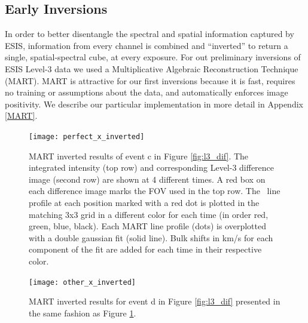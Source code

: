     
    
    
    \subsection{Early Inversions} \label{sec:inversions}
    	In order to better disentangle the spectral and spatial information captured by ESIS, information from every channel is combined and ``inverted'' to return a single, spatial-spectral cube, at every exposure.
    	For out preliminary inversions of ESIS Level-3 data we used a Multiplicative Algebraic Reconstruction Technique (MART).
    	MART is attractive for our first inversions because it is fast, requires no training or assumptions about the data, and automatically enforces image  positivity.
    	We describe our particular implementation in more detail in Appendix \ref{MART}.
    	
    	\begin{figure}[htb!]
    		\texttt{[image: perfect\_x\_inverted]}
    		\centering
    		\caption{MART inverted results of event c in Figure \ref{fig:l3_dif}. The integrated intensity (top row) and corresponding Level-3 difference image (second row) are shown at 4 different times. A red box on each difference image marks the FOV used in the top row.  The \ov \ line profile at each position marked with a red dot is plotted in the matching 3x3 grid in a different color for each time (in order red, green, blue, black). Each MART line profile (dots) is overplotted with a double gaussian fit (solid line).  Bulk shifts in km/s for each component of the fit are added for each time in their respective color. }
    		\label{fig:perfect_x_inverted}
    	\end{figure}
        
        \begin{figure}[htb!]
    	\texttt{[image: other\_x\_inverted]}
    	\centering
    	\caption{MART inverted results for event d in Figure \ref{fig:l3_dif} presented in the same fashion as Figure \ref{fig:perfect_x_inverted}.}
    	\label{fig:other_x_inverted}
    	\end{figure}
    	
